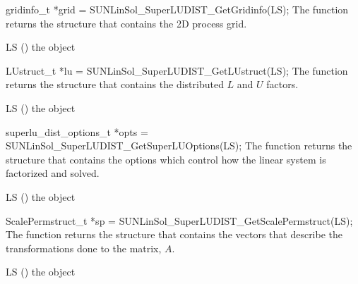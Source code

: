 {
  gridinfo\_t *grid = SUNLinSol\_SuperLUDIST\_GetGridinfo(LS);
}
{
  The function  returns the
  {\superludist} structure that contains the 2D process grid.
}
{
  \begin{args}[LS]
  \item[LS] ()
    the {\sunlinsolsludist} object
  \end{args}
}
{
}
{
}

{
  LUstruct\_t *lu = SUNLinSol\_SuperLUDIST\_GetLUstruct(LS);
}
{
  The function  returns the
  {\superludist} structure that contains the distributed $L$ and $U$ factors.
}
{
  \begin{args}[LS]
  \item[LS] ()
    the {\sunlinsolsludist} object
  \end{args}
}
{
}
{
}

{
  superlu\_dist\_options\_t *opts = SUNLinSol\_SuperLUDIST\_GetSuperLUOptions(LS);
}
{
  The function  returns the
  {\superludist} structure that contains the options which control how
  the linear system is factorized and solved.
}
{
  \begin{args}[LS]
  \item[LS] ()
    the {\sunlinsolsludist} object
  \end{args}
}
{
}
{
}

{
  ScalePermstruct\_t *sp = SUNLinSol\_SuperLUDIST\_GetScalePermstruct(LS);
}
{
  The function  returns the
  {\superludist} structure that contains the vectors that describe the
  transformations done to the matrix, $A$.
}
{
  \begin{args}[LS]
  \item[LS] ()
    the {\sunlinsolsludist} object
  \end{args}
}
{
}
{
}

